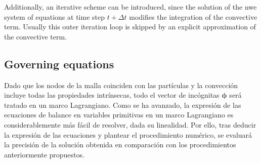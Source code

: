 Additionally, an iterative scheme can be introduced, since the solution of the nwe system of equations at time step $t + \Delta t$ modifies the integration of the convective term. Usually this outer iteration loop is skipped by an explicit approximation of the convective term.



\subsection{Governing equations}

Dado que los nodos de la malla coinciden con las partículas y la convección incluye todas las propiedades intrínsecas, todo el vector de incógnitas $\bm\phi$ será tratado en un marco Lagrangiano.
Como se ha avanzado, la expresión de las ecuaciones de balance en variables primitivas en un marco Lagrangiano es considerablemente más fácil de resolver, dada su linealidad. Por ello, tras deducir la expresión de las ecuaciones y plantear el procedimiento numérico, se evaluará la precisión de la solución obtenida en comparación con los procedimientos anteriormente propuestos.


